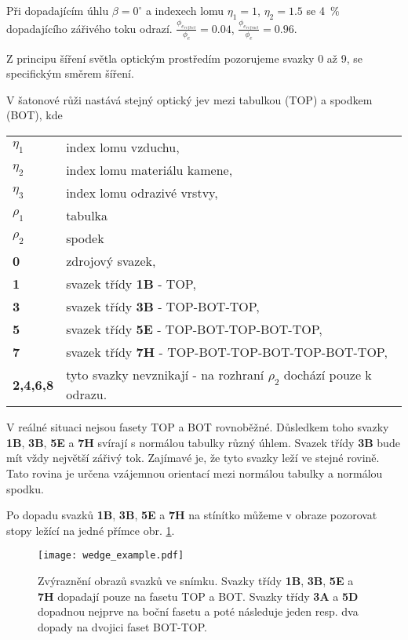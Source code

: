  Při dopadajícím úhlu $\beta = 0^\circ$ a indexech lomu $\eta_1 = 1$, $\eta_2 = 1.5$ se \SI{4}{\percent} dopadajícího zářivého toku odrazí. $\frac{\phi_{e_{reflect}}}{\phi_e} = 0.04$, $\frac{\phi_{e_{refract}}}{\phi_e} = 0.96$.

Z principu šíření světla optickým prostředím pozorujeme svazky 0 až 9, se specifickým směrem šíření. 

V šatonové růži nastává stejný optický jev mezi tabulkou (TOP) a spodkem (BOT), kde
\vspace{4mm}
\begin{tabular}{p{2cm} l}
$\eta_1$ & index lomu vzduchu,\\
$\eta_2$ & index lomu materiálu kamene,\\
$\eta_3$ & index lomu odrazivé vrstvy,\\
$\rho_1$ & tabulka\\
$\rho_2$ & spodek\\
\textbf{0} & zdrojový svazek,\\
\textbf{1} & svazek třídy \textbf{1B} - TOP,\\
\textbf{3} & svazek třídy \textbf{3B} - TOP-BOT-TOP,\\
\textbf{5} & svazek třídy \textbf{5E} - TOP-BOT-TOP-BOT-TOP,\\
\textbf{7} & svazek třídy \textbf{7H} - TOP-BOT-TOP-BOT-TOP-BOT-TOP,\\
\textbf{2,4,6,8} & tyto svazky nevznikají - na rozhraní $\rho_2$ dochází pouze k odrazu.\\
\end{tabular}
\vspace{4mm}

V reálné situaci nejsou fasety TOP a BOT rovnoběžné. Důsledkem toho svazky \textbf{1B}, \textbf{3B}, \textbf{5E} a \textbf{7H} svírají s normálou tabulky různý úhlem. Svazek třídy \textbf{3B} bude mít vždy největší zářivý tok. Zajímavé je, že tyto svazky leží ve stejné rovině. Tato rovina je určena vzájemnou orientací mezi normálou tabulky a normálou spodku.

Po dopadu svazků \textbf{1B}, \textbf{3B}, \textbf{5E} a \textbf{7H} na stínítko můžeme v obraze pozorovat stopy ležící na jedné přímce obr. \ref{fig:wedge_example_image}. 

\begin{figure} [h!]
\centering
\texttt{[image: wedge\_example.pdf]}
\caption{Zvýraznění obrazů svazků ve snímku. Svazky třídy \textbf{1B}, \textbf{3B}, \textbf{5E} a \textbf{7H} dopadají pouze na fasetu TOP a BOT. Svazky třídy \textbf{3A} a \textbf{5D} dopadnou nejprve na boční fasetu a poté následuje jeden resp. dva dopady na dvojici faset BOT-TOP.}
\label{fig:wedge_example_image}
\end{figure}


